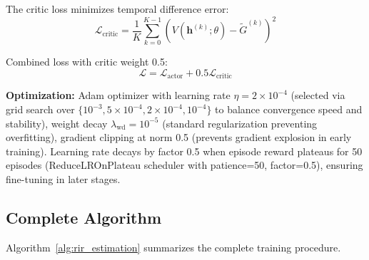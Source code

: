 \documentclass[12pt,a4paper]{article}
\begin{document}
The critic loss minimizes temporal difference error:
\begin{equation}
\mathcal{L}_{\text{critic}} = \frac{1}{K}\sum_{k=0}^{K-1} \left(V(\mathbf{h}^{(k)}; \theta) - \tilde{G}^{(k)}\right)^2
\label{eq:critic_loss}
\end{equation}

Combined loss with critic weight 0.5:
\begin{equation}
\mathcal{L} = \mathcal{L}_{\text{actor}} + 0.5\mathcal{L}_{\text{critic}}
\label{eq:combined_loss}
\end{equation}

\textbf{Optimization:} Adam optimizer \cite{kingma2014adam} with learning rate $\eta=2\times10^{-4}$ (selected via grid search over $\{10^{-3}, 5\times10^{-4}, 2\times10^{-4}, 10^{-4}\}$ to balance convergence speed and stability), weight decay $\lambda_{\text{wd}}=10^{-5}$ (standard regularization preventing overfitting), gradient clipping at norm 0.5 (prevents gradient explosion in early training). Learning rate decays by factor 0.5 when episode reward plateaus for 50 episodes (ReduceLROnPlateau scheduler with patience=50, factor=0.5), ensuring fine-tuning in later stages.

\subsection{Complete Algorithm}

Algorithm~\ref{alg:rir_estimation} summarizes the complete training procedure.
\end{document}
